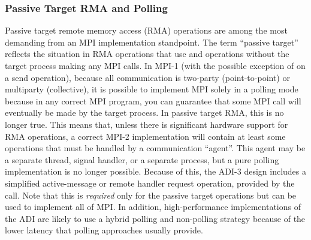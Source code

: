 \documentclass{article}
\begin{document}
\subsubsection{Passive Target RMA and Polling}
\label{sec-passive-target}
Passive target remote memory access (RMA) operations are among the
most demanding from an MPI implementation standpoint.  The term
``passive target'' reflects the situation in RMA operations that use
 and  operations without the
target process making any MPI calls.  In MPI-1 (with the possible
exception of  on a send operation), because all
communication is two-party (point-to-point) or multiparty
(collective), it is possible to implement MPI solely in a polling mode
because in any correct MPI program, you can guarantee that some MPI
call will eventually be made by the target process.  In passive target
RMA, this is no longer true.  This means that, unless there is
significant hardware support for RMA operations, a correct MPI-2
implementation will contain at least some operations that must be
handled by a communication ``agent''.  This agent may be a separate
thread, signal handler, or a separate process, but a pure polling
implementation is no longer possible.  Because of this, the ADI-3
design includes a simplified active-message or remote handler request
operation, provided by the  call.  Note that this is
\emph{required} only for the passive target operations but can be used
to implement all of MPI.  In addition, high-performance
implementations of the ADI are likely to use a hybrid polling and non-polling
strategy because of the lower latency that polling approaches usually provide.
\end{document}
